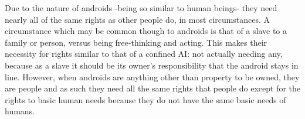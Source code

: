 Due to the nature of androids -being so similar to human beings- they need nearly all of the same rights as other people do, in most circumstances. A circumstance which may be common though to androids is that of a slave to a family or person, versus  being free-thinking and acting. This makes their necessity for rights similar to that of a confined AI: not actually needing any, because as a slave it should be its owner's responsibility that the android stays in line. However, when androids are anything other than property to be owned, they are people and as such they need all the same rights that people do except for the rights to basic human needs because they do not have the same basic needs of humans. 